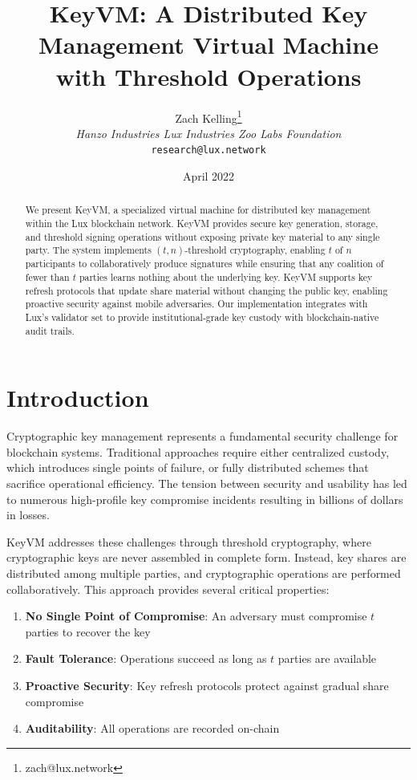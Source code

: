 \documentclass[11pt,twocolumn]{article}
\title{KeyVM: A Distributed Key Management Virtual Machine\\with Threshold Operations}
\author{Zach Kelling\thanks{zach@lux.network} \\ \textit{Hanzo Industries \quad Lux Industries \quad Zoo Labs Foundation} \\ \texttt{research@lux.network}}
\date{April 2022}
\begin{document}
\maketitle

\begin{abstract}
We present KeyVM, a specialized virtual machine for distributed key management within the Lux blockchain network. KeyVM provides secure key generation, storage, and threshold signing operations without exposing private key material to any single party. The system implements $(t,n)$-threshold cryptography, enabling $t$ of $n$ participants to collaboratively produce signatures while ensuring that any coalition of fewer than $t$ parties learns nothing about the underlying key. KeyVM supports key refresh protocols that update share material without changing the public key, enabling proactive security against mobile adversaries. Our implementation integrates with Lux's validator set to provide institutional-grade key custody with blockchain-native audit trails.
\end{abstract}

\section{Introduction}

Cryptographic key management represents a fundamental security challenge for blockchain systems. Traditional approaches require either centralized custody, which introduces single points of failure, or fully distributed schemes that sacrifice operational efficiency. The tension between security and usability has led to numerous high-profile key compromise incidents resulting in billions of dollars in losses.

KeyVM addresses these challenges through threshold cryptography, where cryptographic keys are never assembled in complete form. Instead, key shares are distributed among multiple parties, and cryptographic operations are performed collaboratively. This approach provides several critical properties:

\begin{enumerate}
\item \textbf{No Single Point of Compromise}: An adversary must compromise $t$ parties to recover the key
\item \textbf{Fault Tolerance}: Operations succeed as long as $t$ parties are available
\item \textbf{Proactive Security}: Key refresh protocols protect against gradual share compromise
\item \textbf{Auditability}: All operations are recorded on-chain
\end{enumerate}
\end{document}
